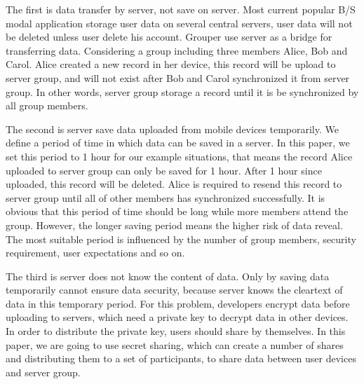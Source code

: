\documentclass[twocolumn,10pt]{article}
\begin{document}
The first is data transfer by server, not save on server. Most current popular B/S modal application storage user data on several central servers, user data will not be deleted unless user delete his account. Grouper use server as a bridge for transferring data. Considering a group including three members Alice, Bob and Carol. Alice created a new record in her device, this record will be upload to server group, and will not exist after Bob and Carol synchronized it from server group. In other words, server group storage a record until it is be synchronized by all group members.

The second is server save data uploaded from mobile devices temporarily. We define a period of time in which data can be saved in a server. In this paper, we set this period to 1 hour for our example situations, that means the record Alice uploaded to server group can only be saved for 1 hour. After 1 hour since uploaded, this record will be deleted. Alice is required to resend this record to server group until all of other members has synchronized successfully. It is obvious that this period of time should be long while more members attend the group. However, the longer saving period means the higher risk of data reveal. The most suitable period is influenced by the number of group members, security requirement, user expectations and so on. 

The third is server does not know the content of data. Only by saving data temporarily cannot ensure data security, because server knows the cleartext of data in this temporary period. For this problem, developers encrypt data before uploading to servers, which need a private key to decrypt data in other devices. In order to distribute the private key, users should share by themselves. In this paper, we are going to use secret sharing, which can create a number of shares and distributing them to a set of participants\cite{smith2013layered}, to share data between user devices and server group.
\end{document}
